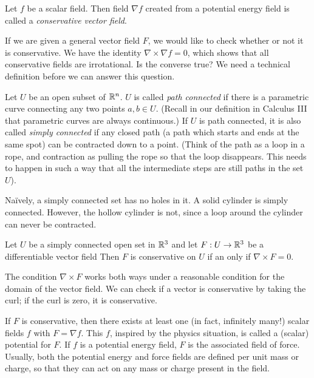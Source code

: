 \documentclass[fleqn,letterpaper]{report}
\begin{document}
\begin{defn}
Let $f$ be a scalar field. Then field $\nabla f$
created from a potential energy field is called a
\emph{conservative vector field}.
\end{defn}

If we are given a general vector field $F$, we would like to
check whether or not it is conservative. We have the identity
$\nabla \times \nabla f=0$, which shows that all conservative
fields are irrotational. Is the converse true? We need a
technical definition before we can answer this question.

\begin{defn}
Let $U$ be an open subset of $\mathbb{R}^n$. $U$ is called
\emph{path connected} if there is a parametric curve
connecting any two points $a, b \in U$. (Recall in our
definition in Calculus III that parametric curves are always
continuous.) If $U$ is path
connected, it is also called \emph{simply connected} if any
closed path (a path which starts and ends at the same spot) can
be contracted down to a point. (Think of the path as a loop
in a rope, and contraction as pulling the rope so that the
loop disappears. This needs to happen in such a way that all
the intermediate steps are still paths in the set $U$). 
\end{defn}

Na\"ively, a simply connected set has no holes in it. A
solid cylinder is simply connected. However, the hollow
cylinder is not, since a loop around the cylinder can never be
contracted.

\begin{prop}
Let $U$ be a simply connected open set in $\mathbb{R}^3$ and let $F:
U \rightarrow \mathbb{R}^3$ be a differentiable vector field 
Then $F$ is conservative on $U$ if an only if $\nabla \times F = 0$.
\end{prop}

The condition $\nabla \times F$ works both ways under a
reasonable condition for the domain of the vector field. We
can check if a vector is conservative by taking the curl; if
the curl is zero, it is conservative.

If $F$ is conservative, then there exists at least one (in
fact, infinitely many!) scalar fields $f$ with $F = \nabla f$.
This $f$, inspired by the physics situation, is called a
(scalar) potential for $F$. If $f$ is a potential energy
field, $F$ is the associated field of force. Usually, both
the potential energy and force fields are defined per unit
mass or charge, so that they can act on any mass or charge
present in the field.
\end{document}
